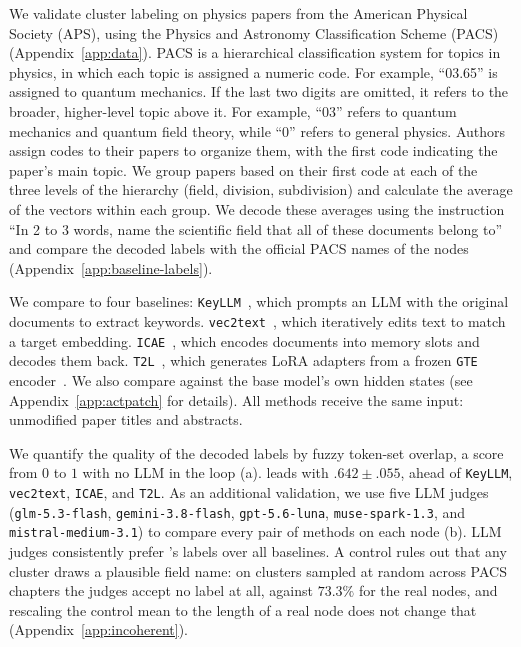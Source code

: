 We validate cluster labeling on physics papers from the American Physical Society (APS), using the Physics and Astronomy Classification Scheme (PACS) (Appendix~\ref{app:data}).
PACS is a hierarchical classification system for topics in physics, in which each topic is assigned a numeric code. 
For example, ``03.65'' is assigned to quantum mechanics.
If the last two digits are omitted, it refers to the broader, higher-level topic above it. For example, ``03'' refers to quantum mechanics and quantum field theory, while ``0'' refers to general physics.
Authors assign codes to their papers to organize them, with the first code indicating the paper's main topic.
We group papers based on their first code at each of the three levels of the hierarchy (field, division, subdivision) and calculate the average of the vectors within each group.
We decode these averages using the instruction ``In 2 to 3 words, name the scientific field that all of these documents belong to'' and compare the decoded labels with the official PACS names of the nodes (Appendix~\ref{app:baseline-labels}).

We compare \doctolora to four baselines: \texttt{KeyLLM}~\citep{grootendorst2023keyllm}, which prompts an LLM with the original documents to extract keywords. 
\texttt{vec2text}~\citep{morris2023vec2text}, which iteratively edits text to match a target embedding.
\texttt{ICAE}~\citep{ge2024icae}, which encodes documents into memory slots and decodes them back.
\texttt{T2L}~\citep{charakorn2025texttolora}, which generates LoRA adapters from a frozen \texttt{GTE} encoder~\citep{li2023gte}. 
We also compare against the base model's own hidden states (see Appendix~\ref{app:actpatch} for details). 
All methods receive the same input: unmodified paper titles and abstracts.

We quantify the quality of the decoded labels by fuzzy token-set overlap, a score from $0$ to $1$ with no LLM in the loop (a).
\doctolora leads with $.642 \pm .055$, ahead of \texttt{KeyLLM}, \texttt{vec2text}, \texttt{ICAE}, and \texttt{T2L}.
As an additional validation, we use five LLM judges (\texttt{glm-5.3-flash}, \texttt{gemini-3.8-flash}, \texttt{gpt-5.6-luna}, \texttt{muse-spark-1.3}, and \texttt{mistral-medium-3.1}) to compare every pair of methods on each node (b).
LLM judges consistently prefer \doctolora's labels over all baselines.
A control rules out that any cluster draws a plausible field name: on clusters sampled at random across PACS chapters the judges accept no label at all, against $73.3\%$ for the real nodes, and rescaling the control mean to the length of a real node does not change that (Appendix~\ref{app:incoherent}).

